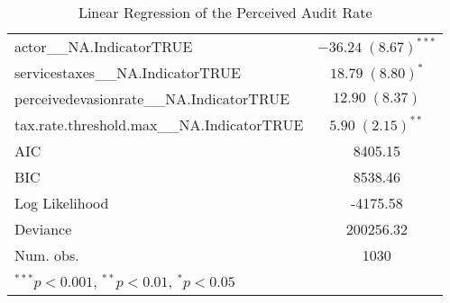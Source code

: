 \begin{table}
\begin{tabular}{l c }
actor\_\_NA.IndicatorTRUE                  & $-36.24 \; (8.67)^{***}$ \\
servicestaxes\_\_NA.IndicatorTRUE          & $18.79 \; (8.80)^{*}$    \\
perceivedevasionrate\_\_NA.IndicatorTRUE   & $12.90 \; (8.37)$        \\
tax.rate.threshold.max\_\_NA.IndicatorTRUE & $5.90 \; (2.15)^{**}$    \\
\hline
AIC                                        & 8405.15                  \\
BIC                                        & 8538.46                  \\
Log Likelihood                             & -4175.58                 \\
Deviance                                   & 200256.32                \\
Num. obs.                                  & 1030                     \\
\hline
\multicolumn{2}{l}{\scriptsize{$^{***}p<0.001$, $^{**}p<0.01$, $^*p<0.05$}}
\end{tabular}
\caption{Linear Regression of the Perceived Audit Rate}
\label{table:coefficients}
\end{table}
